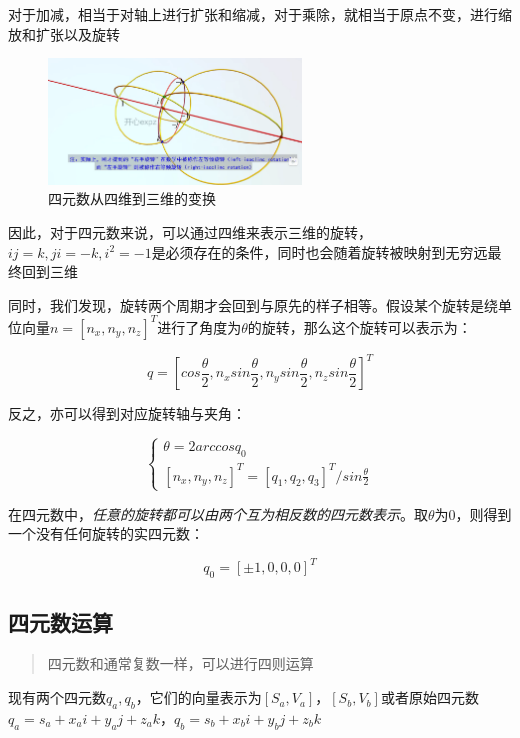     对于加减，相当于对轴上进行扩张和缩减，对于乘除，就相当于原点不变，进行缩放和扩张以及旋转

\begin{figure}[!htbp]
    \centering
    \includegraphics[width=0.6\textwidth]{image/chapter02/四元数到三维的变换模型.png}
    \caption{四元数从四维到三维的变换}
\end{figure}

    因此，对于四元数来说，可以通过四维来表示三维的旋转，$ij = k, ji = -k, i^2 = -1$是必须存在的条件，同时也会随着旋转被映射到无穷远最终回到三维

    同时，我们发现，旋转两个周期才会回到与原先的样子相等。假设某个旋转是绕单位向量$n = [n_x, n_y, n_z]^T$进行了角度为$\theta$的旋转，那么这个旋转可以表示为：

$$
    q = [cos\frac{\theta}{2}, n_xsin\frac{\theta}{2}, n_ysin\frac{\theta}{2}, n_zsin\frac{\theta}{2}]^T
$$

    反之，亦可以得到对应旋转轴与夹角：

$$
\begin{cases}
    \theta = 2arccosq_0 \\
    [n_x, n_y, n_z]^T = [q_1, q_2, q_3]^T / sin\frac{\theta}{2}
\end{cases}
$$

    在四元数中，\emph{任意的旋转都可以由两个互为相反数的四元数表示}。取$\theta$为0，则得到一个没有任何旋转的实四元数：

$$
    q_0 = [\pm1, 0, 0, 0]^T
$$

\subsection{四元数运算}

\begin{quote}
    \centering
    四元数和通常复数一样，可以进行四则运算
\end{quote}

    现有两个四元数$q_a, q_b$，它们的向量表示为$[S_a, V_a]，[S_b, V_b]$或者原始四元数$q_a = s_a + x_ai + y_aj + z_ak，q_b = s_b + x_bi + y_bj + z_bk$

